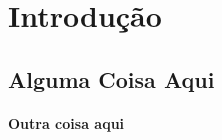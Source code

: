 \justifying
\chapter{Introdução}
\lipsum[1-2]
\section{Alguma Coisa Aqui}
\lipsum[3-4]
\subsubsection{Outra coisa aqui}
\lipsum[4-5]